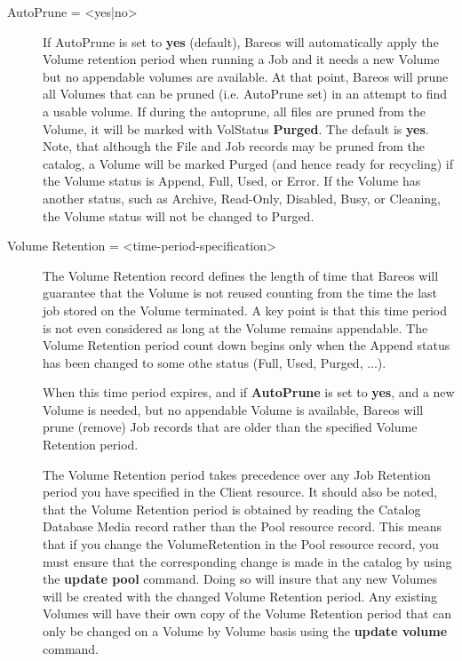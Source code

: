 \begin{description}

\item [AutoPrune = {\textless}yes|no{\textgreater}]
   If AutoPrune is set to  {\bf yes} (default), Bareos
   will  automatically apply the Volume retention period when running a Job  and
   it needs a new Volume but no appendable volumes are available.  At that point,
   Bareos will prune all Volumes that can be pruned  (i.e. AutoPrune set) in an
   attempt to find a usable volume. If  during the autoprune, all files are
   pruned from the Volume, it  will be marked with VolStatus {\bf Purged}.  The
   default is {\bf yes}. Note, that although the File and Job records may be
   pruned from the catalog, a Volume will be marked Purged (and hence
   ready for recycling) if the Volume status is Append, Full, Used, or Error.
   If the Volume has another status, such as Archive, Read-Only, Disabled,
   Busy, or Cleaning, the Volume status will not be changed to Purged.

\item [Volume Retention = {\textless}time-period-specification{\textgreater}]
   The Volume Retention record defines the length of time that Bareos will
   guarantee that the Volume is not reused counting from the time the last
   job stored on the Volume terminated.  A key point is that this time
   period is not even considered as long at the Volume remains appendable.
   The Volume Retention period count down begins only when the Append
   status has been changed to some othe status (Full, Used, Purged, ...).

   When this time period expires, and if {\bf AutoPrune} is set to {\bf
   yes}, and a new Volume is needed, but no appendable Volume is available,
   Bareos will prune (remove) Job records that are older than the specified
   Volume Retention period.

   The Volume Retention period takes precedence over any Job Retention
   period you have specified in the Client resource.  It should also be
   noted, that the Volume Retention period is obtained by reading the
   Catalog Database Media record rather than the Pool resource record.
   This means that if you change the VolumeRetention in the Pool resource
   record, you must ensure that the corresponding change is made in the
   catalog by using the {\bf update pool} command.  Doing so will insure
   that any new Volumes will be created with the changed Volume Retention
   period.  Any existing Volumes will have their own copy of the Volume
   Retention period that can only be changed on a Volume by Volume basis
   using the {\bf update volume} command.


\end{description}

